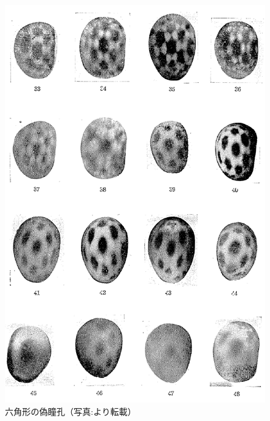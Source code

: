 \begin{figure}[htbp]
  \centering
  \includegraphics[width=4.5in]{./img/yagi1-hex-real.png}
  \caption{六角形の偽瞳孔（写真:\cite{yagi1951studies}より転載）}
  \label{FYagiHex}
\end{figure}

